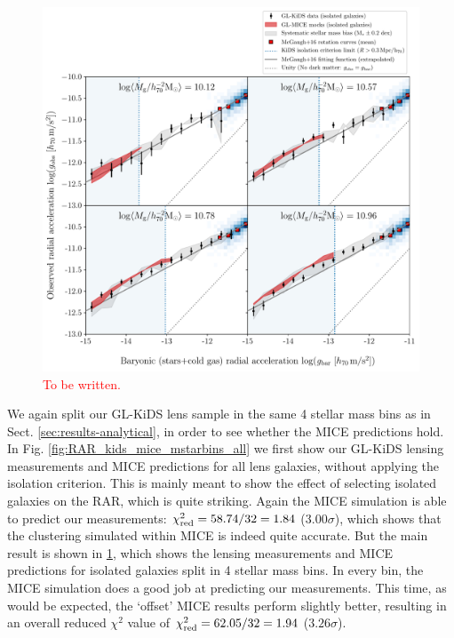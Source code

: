 \documentclass[usenatbib]{mnras}
\newcommand{\un}[1]{_{\rm #1}}
\begin{document}
\begin{figure}
	\includegraphics[width=\textwidth]{Figures/RAR_KiDS+MICE_4-massbins_isolated.pdf}
	\caption{\textcolor{red}{To be written.}}
	\label{fig:RAR_kids_mice_mstarbins}
\end{figure}

We again split our GL-KiDS lens sample in the same 4 stellar mass bins as in Sect. \ref{sec:results-analytical}, in order to see whether the MICE predictions hold. In Fig. \ref{fig:RAR_kids_mice_mstarbins_all} we first show our GL-KiDS lensing measurements and MICE predictions for all lens galaxies, without applying the isolation criterion. This is mainly meant to show the effect of selecting isolated galaxies on the RAR, which is quite striking. Again the MICE simulation is able to predict our measurements: $\chi\un{red}^2 = 58.74 / 32 = 1.84$ ($3.00 \sigma$), which shows that the clustering simulated within MICE is indeed quite accurate.
But the main result is shown in \ref{fig:RAR_kids_mice_mstarbins}, which shows the lensing measurements and MICE predictions for isolated galaxies split in 4 stellar mass bins. In every bin, the MICE simulation does a good job at predicting our measurements. This time, as would be expected, the `offset' MICE results perform slightly better, resulting in an overall reduced $\chi^2$ value of $\chi\un{red}^2 = 62.05 / 32 = 1.94$ ($3.26 \sigma$).
\end{document}

